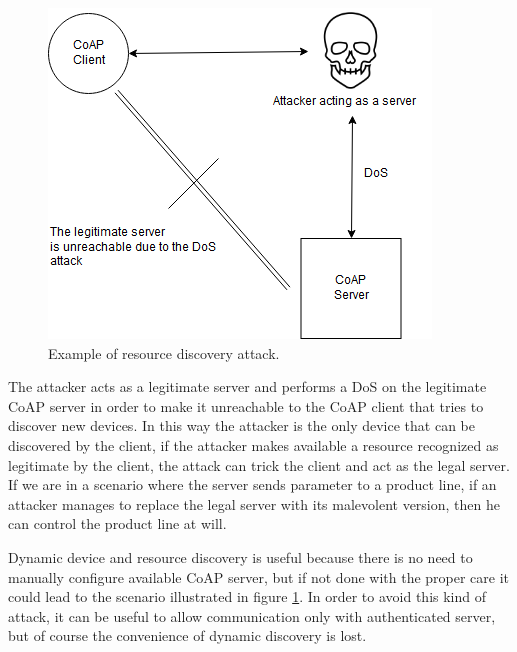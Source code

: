 	\begin{figure}
		\includegraphics[width=\linewidth]{coap-vuln-img5.png}
		\caption{Example of resource discovery attack.}
		\label{fig:coap-vuln5}
	\end{figure}
	
	The attacker acts as a legitimate server and performs a DoS on the legitimate CoAP server in order to make it unreachable to the CoAP client that tries to discover new devices.\newline
	In this way the attacker is the only device that can be discovered by the client, if the attacker makes available a resource recognized as legitimate by the client, the attack can trick the client and act as the legal server.\newline
	If we are in a scenario where the server sends parameter to a product line, if an attacker manages to replace the legal server with its malevolent version, then he can control the product line at will.\newline
	
	Dynamic device and resource discovery is useful because there is no need to manually configure available CoAP server, but if not done with the proper care it could lead to the scenario illustrated in figure \ref{fig:coap-vuln5}.
	In order to avoid this kind of attack, it can be useful to allow communication only with authenticated server, but of course the convenience of dynamic discovery is lost.\newline
		
